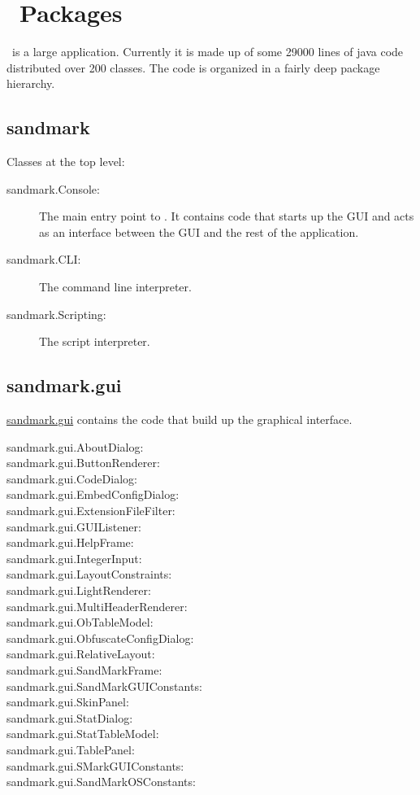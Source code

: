 \section{\SM\ Packages}
\SM\ is a large application. Currently it is made
up of some 29000 lines of java code distributed over
200 classes. The code is organized in a fairly deep 
package hierarchy.

\subsection{sandmark}
Classes at the top level:
\begin{description}
   \item[sandmark.Console:] 
         The main entry point to \SM. It contains code
         that starts up the GUI and acts as an interface
         between the GUI and the rest of the application.
   \item[sandmark.CLI:]
         The command line interpreter.
   \item[sandmark.Scripting:]
         The script interpreter.
\end{description}

\subsection{sandmark.gui}
\url{sandmark.gui} contains the code that
build up the graphical interface.
\begin{description}
   \item[sandmark.gui.AboutDialog:]
   \item[sandmark.gui.ButtonRenderer:]
   \item[sandmark.gui.CodeDialog:]
   \item[sandmark.gui.EmbedConfigDialog:]
   \item[sandmark.gui.ExtensionFileFilter:]
   \item[sandmark.gui.GUIListener:]
   \item[sandmark.gui.HelpFrame:]
   \item[sandmark.gui.IntegerInput:]
   \item[sandmark.gui.LayoutConstraints:]
   \item[sandmark.gui.LightRenderer:]
   \item[sandmark.gui.MultiHeaderRenderer:]
   \item[sandmark.gui.ObTableModel:]
   \item[sandmark.gui.ObfuscateConfigDialog:]
   \item[sandmark.gui.RelativeLayout:]
   \item[sandmark.gui.SandMarkFrame:]
   \item[sandmark.gui.SandMarkGUIConstants:]
   \item[sandmark.gui.SkinPanel:]
   \item[sandmark.gui.StatDialog:]
   \item[sandmark.gui.StatTableModel:]
   \item[sandmark.gui.TablePanel:]
   \item[sandmark.gui.SMarkGUIConstants:]
   \item[sandmark.gui.SandMarkOSConstants:]
\end{description}

